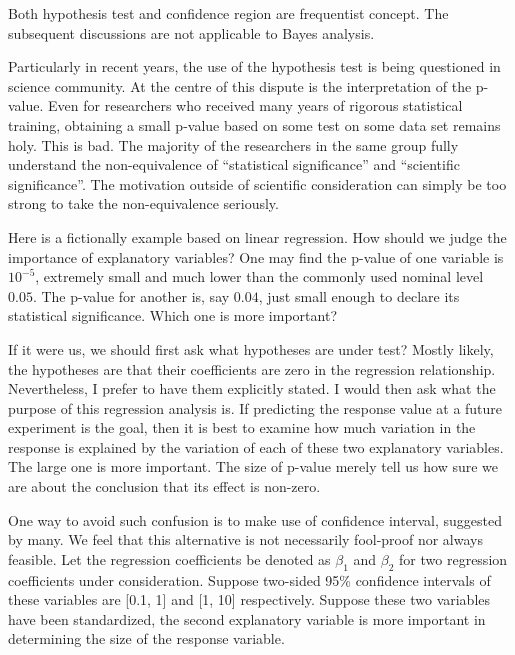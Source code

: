 Both  hypothesis test and confidence region are frequentist concept.
The subsequent discussions are not applicable to Bayes analysis.

Particularly in recent years, the use of the hypothesis test is being questioned
in science community. At the centre of this dispute is the interpretation of the
p-value. Even for researchers who received many years of rigorous statistical 
training, obtaining a small p-value based on some test on some data set remains holy.
This is bad.
The majority of the researchers in the same group fully understand the 
non-equivalence of ``statistical significance'' and ``scientific significance''.
The motivation outside of scientific consideration can simply be too strong 
to take the non-equivalence seriously.

Here is a fictionally example based on linear regression. How should we judge
the importance of explanatory variables? One may find the p-value of one variable
is $10^{-5}$, extremely small and much lower than the commonly used nominal
level $0.05$. The p-value for another is, say $0.04$, just small enough to declare
its statistical significance. Which one is more important?

If it were us, we should first ask what hypotheses are under test? Mostly likely,
the hypotheses are that their coefficients are zero in the regression relationship.
Nevertheless, I prefer to have them explicitly stated.
I would then ask what the purpose of this regression analysis is.
If predicting the response value at a future experiment is the goal,
then it is best to examine how much variation in the response is
explained by the variation of each of these two explanatory variables.
The large one is more important. The size of p-value merely tell us
how sure we are about the conclusion that its effect is non-zero.

One way to avoid such confusion is to make use of confidence interval,
suggested by many. We feel that this alternative is not necessarily fool-proof nor
always feasible. Let the regression coefficients be denoted as $\beta_1$
and $\beta_2$ for two regression coefficients under consideration. 
Suppose two-sided 95\% confidence intervals of these variables are [0.1, 1] and [1, 10]
respectively. Suppose these two variables have been standardized,
the second explanatory variable is more important in determining the
size of the response variable.


